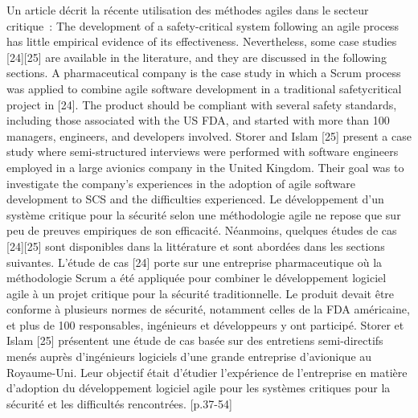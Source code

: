 {Un article décrit la récente utilisation des méthodes agiles dans le secteur critique~:
\quoteenfr
{The development of a safety-critical system following an agile process has little empirical evidence of its effectiveness. Nevertheless, some case studies [24][25] are available in the literature, and they are discussed in the following sections.
A pharmaceutical company is the case study in which a Scrum process was applied to combine agile software development in a traditional safetycritical project in [24]. The product should be compliant with several safety standards, including those associated with the US FDA, and started with more than 100 managers, engineers, and developers involved.
\elide
Storer and Islam [25] present a case study where semi-structured interviews were performed with software engineers employed in a large avionics company in the United Kingdom. Their goal was to investigate the company’s experiences in the adoption of agile software development to SCS and the difficulties experienced.}
{Le développement d'un système critique pour la sécurité selon une méthodologie agile ne repose que sur peu de preuves empiriques de son efficacité. Néanmoins, quelques études de cas [24][25] sont disponibles dans la littérature et sont abordées dans les sections suivantes.
L'étude de cas [24] porte sur une entreprise pharmaceutique où la méthodologie Scrum a été appliquée pour combiner le développement logiciel agile à un projet critique pour la sécurité traditionnelle. Le produit devait être conforme à plusieurs normes de sécurité, notamment celles de la FDA américaine, et plus de 100 responsables, ingénieurs et développeurs y ont participé.
\elide
Storer et Islam [25] présentent une étude de cas basée sur des entretiens semi-directifs menés auprès d'ingénieurs logiciels d'une grande entreprise d'avionique au Royaume-Uni. Leur objectif était d'étudier l'expérience de l'entreprise en matière d'adoption du développement logiciel agile pour les systèmes critiques pour la sécurité et les difficultés rencontrées.}
{[p.37-54]}

}
